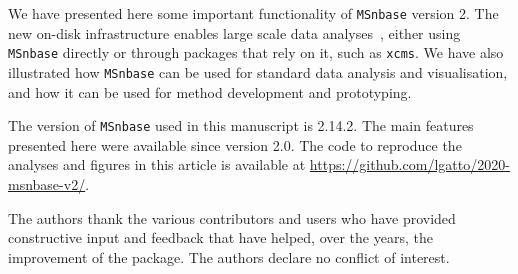 \documentclass[journal=jacsat,manuscript=article]{achemso}\usepackage[]{graphicx}\usepackage[]{color}
\begin{document}
We have presented here some important functionality of
\texttt{MSnbase} version 2. The new on-disk infrastructure enables
large scale data analyses~\cite{Nothias:2020}, either using
\texttt{MSnbase} directly or through packages that rely on it, such as
\texttt{xcms}. We have also illustrated how \texttt{MSnbase} can be
used for standard data analysis and visualisation, and how it can be
used for method development and prototyping.





The version of \texttt{MSnbase} used in this manuscript is
2.14.2. The main features presented here were available since
version 2.0. The code to reproduce the analyses and figures in this
article is available at
\url{https://github.com/lgatto/2020-msnbase-v2/}.


\begin{acknowledgement}

The authors thank the various contributors and users who have provided
constructive input and feedback that have helped, over the years, the
improvement of the package. The authors declare no conflict of
interest.

\end{acknowledgement}




\end{document}
